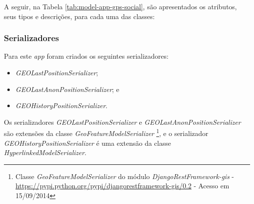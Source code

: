 A seguir, na Tabela \ref{tab:model-app-gps-social}, são apresentados os atributos, seus tipos e descrições, para cada uma das classes:

\begin{table}[htb]
\end{table}

\subsubsection{Serializadores}
Para este \textit{app} foram criados os seguintes serializadores:
\begin{itemize}
    \item \textit{GEOLastPositionSerializer};
    \item \textit{GEOLastAnonPositionSerializer}; e
    \item \textit{GEOHistoryPositionSerializer}.
\end{itemize}

Os serializadores \textit{GEOLastPositionSerializer} e \textit{GEOLastAnonPositionSerializer} são extensões da classe \mbox{\textit{GeoFeatureModelSerializer}}%
\footnote{Classe \textit{GeoFeatureModelSerializer} do módulo \textit{DjangoRestFramework-gis} - \url{https://pypi.python.org/pypi/djangorestframework-gis/0.2} - Acesso em 15/09/2014},
e o serializador \mbox{\textit{GEOHistoryPositionSerializer}} é uma extensão da classe \mbox{\textit{HyperlinkedModelSerializer}}.

